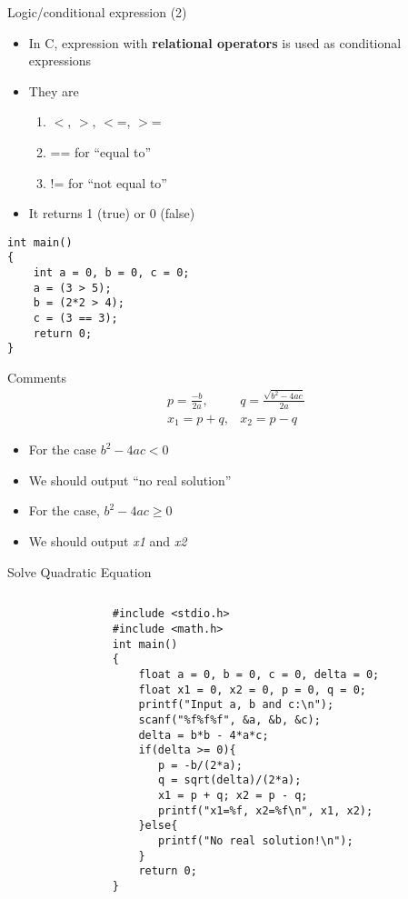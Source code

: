 \begin{frame}[fragile]{Logic/conditional expression (2)}
	\begin{itemize}
		\item {In C, expression with \textbf{relational operators} is used as conditional expressions}
		\item {They are}
		\begin{enumerate}
			\item {$<$, $>$, $<$=, $>$=}
			\item {== for ``equal to''}
			\item {!= for ``not equal to''}
		\end{enumerate}
		\item {It returns 1 (true) or 0 (false)}
	\end{itemize}
\begin{lstlisting}
int main()
{
    int a = 0, b = 0, c = 0;
    a = (3 > 5);
    b = (2*2 > 4);
    c = (3 == 3);
    return 0;
}
\end{lstlisting} 
\end{frame}

\begin{frame}[fragile]{Comments}
\vspace{-0.3in}
\begin{eqnarray}
p=\frac{-b}{2a}, & q=\frac{\sqrt{b^2-4ac}}{2a} \nonumber \\
x_1=p+q, & x_2=p-q \nonumber
\end{eqnarray}
\begin{itemize}
	\item {For the case ${b^2-4ac} < 0$}
	\item {We should output ``no real solution''}
	\item {For the case, ${b^2-4ac} \geq 0$}
	\item {We should output \textit{x1} and \textit{x2}}
\end{itemize}

\end{frame}

\begin{frame}[fragile]{Solve Quadratic Equation}
\vspace{-0.1in}
	\begin{columns}
		\begin{column}{0.1\linewidth}
		\end{column}
		\begin{column}{0.9\linewidth}
	\begin{lstlisting}[]
#include <stdio.h>
#include <math.h>
int main()
{
    float a = 0, b = 0, c = 0, delta = 0;
    float x1 = 0, x2 = 0, p = 0, q = 0;
    printf("Input a, b and c:\n");
    scanf("%f%f%f", &a, &b, &c);
    delta = b*b - 4*a*c;
    if(delta >= 0){
       p = -b/(2*a);
       q = sqrt(delta)/(2*a);
       x1 = p + q; x2 = p - q;
       printf("x1=%f, x2=%f\n", x1, x2);
    }else{
       printf("No real solution!\n");
    }
    return 0;
}
\end{lstlisting}
\end{column}
\end{columns}
\end{frame}

